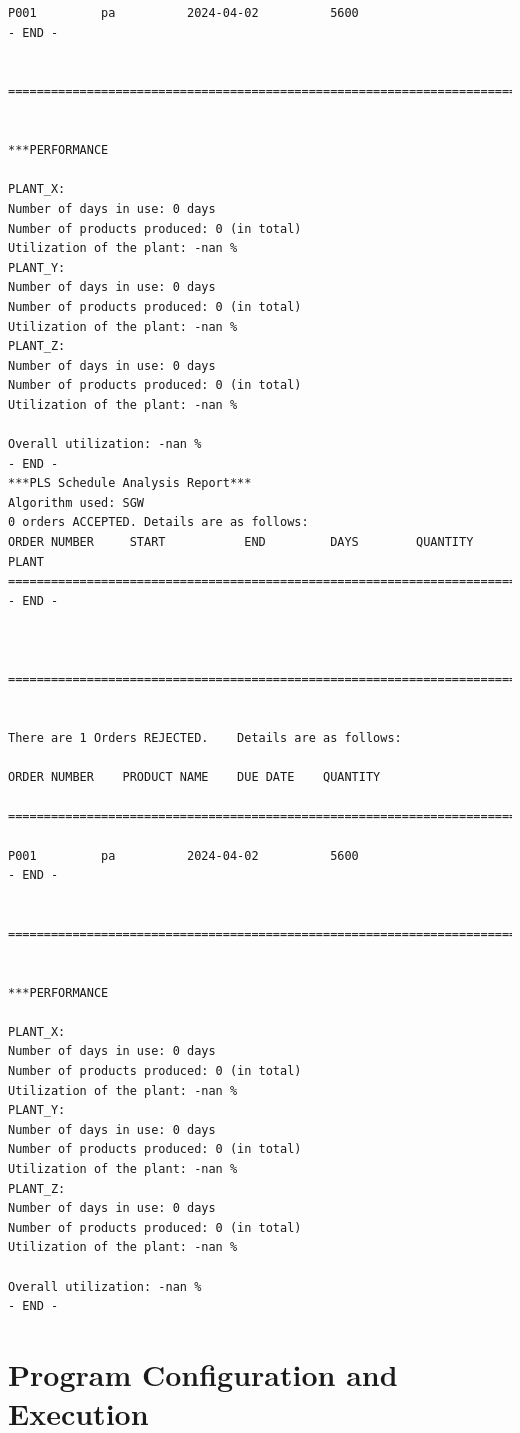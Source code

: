 \documentclass[a4paper, 12pt]{article}
\begin{document}
\begin{lstlisting}
P001         pa          2024-04-02          5600
- END -


===========================================================================================================


***PERFORMANCE

PLANT_X:
Number of days in use: 0 days
Number of products produced: 0 (in total)
Utilization of the plant: -nan %
PLANT_Y:
Number of days in use: 0 days
Number of products produced: 0 (in total)
Utilization of the plant: -nan %
PLANT_Z:
Number of days in use: 0 days
Number of products produced: 0 (in total)
Utilization of the plant: -nan %

Overall utilization: -nan %
- END -
***PLS Schedule Analysis Report***
Algorithm used: SGW
0 orders ACCEPTED. Details are as follows:
ORDER NUMBER     START           END         DAYS        QUANTITY        PLANT
===========================================================================================
- END -



==========================================================================================================


There are 1 Orders REJECTED.    Details are as follows:

ORDER NUMBER    PRODUCT NAME    DUE DATE    QUANTITY

==========================================================================================================

P001         pa          2024-04-02          5600
- END -


===========================================================================================================


***PERFORMANCE

PLANT_X:
Number of days in use: 0 days
Number of products produced: 0 (in total)
Utilization of the plant: -nan %
PLANT_Y:
Number of days in use: 0 days
Number of products produced: 0 (in total)
Utilization of the plant: -nan %
PLANT_Z:
Number of days in use: 0 days
Number of products produced: 0 (in total)
Utilization of the plant: -nan %

Overall utilization: -nan %
- END -
\end{lstlisting}

\section{Program Configuration and Execution}
\end{document}
